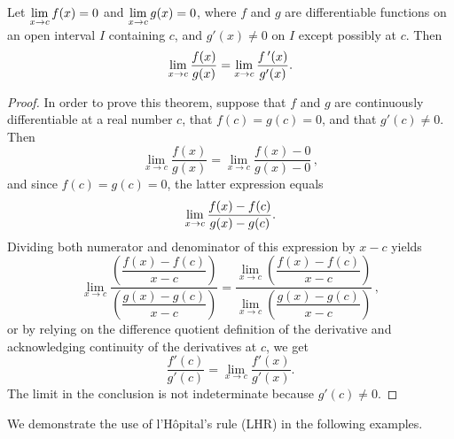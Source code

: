 \begin{theorem}\label{thm:LHR}
Let $\displaystyle \lim_{x\to c}f(x) = 0$ and $\displaystyle \lim_{x\to c}g(x)=0$, where $f$ and $g$ are differentiable functions on an open interval $I$ containing $c$, and $g'(x)\neq 0$ on $I$ except possibly at $c$. Then  
$$ \lim_{x\to c} \frac{f(x)}{g(x)} = \lim_{x\to c} \frac{f\,'(x)}{g'(x)}.$$
\end{theorem}

\ifanalysis

\begin{proof}
In order to prove this theorem, suppose that $f$ and $g$ are continuously differentiable at a real number $c$, that $f(c)=g(c)=0$, and that $g'(c)\neq 0$. Then
$$
\displaystyle \lim _{x\to c}{\dfrac {f(x)}{g(x)}}=\lim _{x\to c}{\dfrac {f(x)-0}{g(x)-0}}\,,
$$
and since $f(c)=g(c)=0$, the latter expression equals
$$
\lim _{x\to c}{\dfrac {f(x)-f(c)}{g(x)-g(c)}}\\[6pt].
$$
Dividing both numerator and denominator of this expression by $x-c$ yields
$$
\lim _{x\to c}{\dfrac {\left({\dfrac {f(x)-f(c)}{x-c}}\right)}{\left({\dfrac {g(x)-g(c)}{x-c}}\right)}}={\dfrac {\lim \limits _{x\to c}\left({\dfrac {f(x)-f(c)}{x-c}}\right)}{\lim \limits _{x\to c}\left({\dfrac {g(x)-g(c)}{x-c}}\right)}}\,,
$$
or by relying on the difference quotient definition of the derivative and acknowledging continuity of the derivatives at $c$, we get 
$$
{\frac {f'(c)}{g'(c)}}=\lim _{x\to c}{\dfrac {f'(x)}{g'(x)}}.
$$
 The limit in the conclusion is not indeterminate because $g'(c)\neq 0$. 
\end{proof}

\fi





We demonstrate the use of l'H\^opital's rule (LHR) in the following examples.

